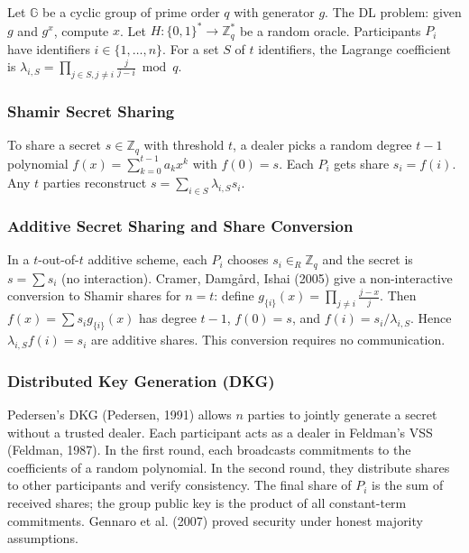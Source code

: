 Let \(\mathbb{G}\) be a cyclic group of prime order \(q\) with generator \(g\). The DL problem: given \(g\) and \(g^x\), compute \(x\). Let \(H:\{0,1\}^*\to\mathbb{Z}_q^*\) be a random oracle. Participants \(P_i\) have identifiers \(i\in\{1,\ldots,n\}\). For a set \(S\) of \(t\) identifiers, the Lagrange coefficient is \(\lambda_{i,S}=\prod_{j\in S,j\neq i}\frac{j}{j-i}\bmod q\).

\subsubsection{Shamir Secret Sharing}

To share a secret \(s\in\mathbb{Z}_q\) with threshold \(t\), a dealer picks a random degree \(t-1\) polynomial \(f(x)=\sum_{k=0}^{t-1}a_kx^k\) with \(f(0)=s\). Each \(P_i\) gets share \(s_i=f(i)\). Any \(t\) parties reconstruct \(s=\sum_{i\in S}\lambda_{i,S}s_i\).

\subsubsection{Additive Secret Sharing and Share Conversion}

In a \(t\)-out-of-\(t\) additive scheme, each \(P_i\) chooses \(s_i\in_R\mathbb{Z}_q\) and the secret is \(s=\sum s_i\) (no interaction). Cramer, Damgård, Ishai (2005) give a non-interactive conversion to Shamir shares for \(n=t\): define \(g_{\{i\}}(x)=\prod_{j\neq i}\frac{j-x}{j}\). Then \(f(x)=\sum s_i g_{\{i\}}(x)\) has degree \(t-1\), \(f(0)=s\), and \(f(i)=s_i/\lambda_{i,S}\). Hence \(\lambda_{i,S}f(i)=s_i\) are additive shares. This conversion requires no communication.

\subsubsection{Distributed Key Generation (DKG)}

Pedersen’s DKG (Pedersen, 1991) allows \(n\) parties to jointly generate a secret without a trusted dealer. Each participant acts as a dealer in Feldman’s VSS (Feldman, 1987). In the first round, each broadcasts commitments to the coefficients of a random polynomial. In the second round, they distribute shares to other participants and verify consistency. The final share of \(P_i\) is the sum of received shares; the group public key is the product of all constant-term commitments. Gennaro et al. (2007) proved security under honest majority assumptions.

